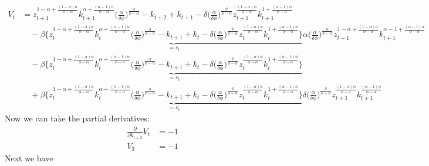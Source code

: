 \documentclass[a4paper]{article}
\theoremstyle{definition}
\begin{document}
	\begin{align*}
	V_t 	&= z_{t+1}^{1-\alpha+\frac{(1-\alpha)\alpha}{\phi-\alpha}} k_{t+1}^{\alpha+\frac{(\alpha-1)\alpha}{\phi-\alpha}} \Big( \frac{\alpha}{\delta\phi} \Big)^{\frac{\alpha}{\phi-\alpha}}-k_{t+2} + k_{t+1} - \delta \Big( \frac{\alpha}{\delta\phi} \Big)^{\frac{\phi}{\phi-\alpha}}z_{t+1}^{\frac{(1-\alpha)\phi}{\phi-\alpha}}k_{t+1}^{1+\frac{(\alpha-1)\phi}{\phi-\alpha}} \\
			&\quad - \beta \underbrace{\Big\{ z_{t}^{1-\alpha+\frac{(1-\alpha)\alpha}{\phi-\alpha}} k_{t}^{\alpha+\frac{(\alpha-1)\alpha}{\phi-\alpha}} \Big( \frac{\alpha}{\delta\phi} \Big)^{\frac{\alpha}{\phi-\alpha}}-k_{t+1} + k_{t} - \delta \Big( \frac{\alpha}{\delta\phi} \Big)^{\frac{\phi}{\phi-\alpha}}z_{t}^{\frac{(1-\alpha)\phi}{\phi-\alpha}}k_{t}^{1+\frac{(\alpha-1)\phi}{\phi-\alpha}} \Big\}}_{=c_t} \alpha \Big( \frac{\alpha}{\delta\phi} \Big)^{\frac{\alpha}{\phi-\alpha}} z_{t+1}^{1-\alpha+\frac{(1-\alpha)\alpha}{\phi-\alpha}}k_{t+1}^{\alpha-1+\frac{(\alpha-1)\alpha}{\phi-\alpha}} \\
			&\quad - \beta \underbrace{\Big\{ z_{t}^{1-\alpha+\frac{(1-\alpha)\alpha}{\phi-\alpha}} k_{t}^{\alpha+\frac{(\alpha-1)\alpha}{\phi-\alpha}} \Big( \frac{\alpha}{\delta\phi} \Big)^{\frac{\alpha}{\phi-\alpha}}-k_{t+1} + k_{t} - \delta \Big( \frac{\alpha}{\delta\phi} \Big)^{\frac{\phi}{\phi-\alpha}}z_{t}^{\frac{(1-\alpha)\phi}{\phi-\alpha}}k_{t}^{1+\frac{(\alpha-1)\phi}{\phi-\alpha}} \Big\}}_{=c_t} \\
			&\quad + \beta \underbrace{\Big\{ z_{t}^{1-\alpha+\frac{(1-\alpha)\alpha}{\phi-\alpha}} k_{t}^{\alpha+\frac{(\alpha-1)\alpha}{\phi-\alpha}} \Big( \frac{\alpha}{\delta\phi} \Big)^{\frac{\alpha}{\phi-\alpha}}-k_{t+1} + k_{t} - \delta \Big( \frac{\alpha}{\delta\phi} \Big)^{\frac{\phi}{\phi-\alpha}}z_{t}^{\frac{(1-\alpha)\phi}{\phi-\alpha}}k_{t}^{1+\frac{(\alpha-1)\phi}{\phi-\alpha}} \Big\}}_{=c_t} \delta \Big( \frac{\alpha}{\delta\phi} \Big)^{\frac{\phi}{\phi-\alpha}}z_{t+1}^{\frac{(1-\alpha)\phi}{\phi-\alpha}}k_{t+1}^{\frac{(\alpha-1)\phi}{\phi-\alpha}}
	\end{align*}	
Now we can take the partial derivatives:
	\begin{align*}
	\frac{\partial}{\partial k_{t+2}}V_t 									&= -1  \\
	V_3 	&= -1 
	\end{align*}	
Next we have	
\end{document}
